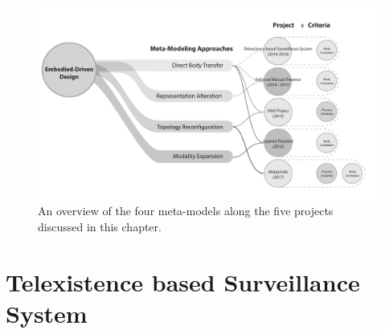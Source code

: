 \begin{figure}[h!]
  \centering
	  \includegraphics[width=1\linewidth]{figures/intro/MetaModelingOverview.pdf}
  \captionsetup{justification=centering}
  \caption{An overview of the four meta-models along the five projects discussed in this chapter.}
  \label{fig:eval-overview-MetaModelReq}
\end{figure}



\section{Telexistence based Surveillance System}
\label{sec:eval-txSys}


